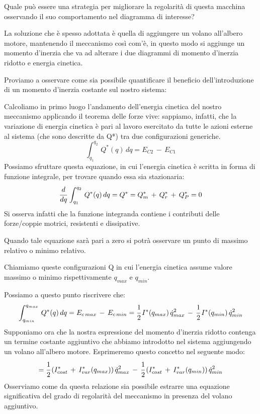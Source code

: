 Quale può essere una strategia per migliorare la regolarità di questa macchina osservando il suo comportamento nel diagramma di interesse?

La soluzione che è spesso adottata è quella di aggiungere un volano all'albero motore, mantenendo il meccanismo così com'è, in questo modo si aggiunge un momento d'inerzia che va ad alterare i due diagrammi di momento d'inerzia ridotto e energia cinetica.

Proviamo a osservare come sia possibile quantificare il beneficio dell'introduzione di un momento d'inerzia costante sul nostro sistema:

Calcoliamo in primo luogo l'andamento dell'energia cinetica del nostro meccanismo applicando il teorema delle forze vive: sappiamo, infatti, che la variazione di energia cinetica è pari al lavoro esercitato da tutte le azioni esterne al sistema (che sono descritte da Q*) tra due configurazioni generiche.
\[\int_{q_1}^{q_2}\,Q^*(q)\,dq = E_{C2}\,-\,E_{C1}\]
Possiamo sfruttare questa equazione, in cui l'energia cinetica è scritta in forma di funzione integrale, per trovare quando essa sia stazionaria:
\[\cfrac{d}{dq}\,\int_{q_1}^{q_2}\,Q^*(q)\,dq = Q^* = Q^*_m\,+\,Q^*_r\,+\,Q^*_P = 0\]
Si osserva infatti che la funzione integranda contiene i contributi delle forze/coppie motrici, resistenti e dissipative.

Quando tale equazione sarà  pari a zero si potrà osservare un punto di massimo relativo o minimo relativo.

Chiamiamo queste configurazioni Q in cui l'energia cinetica assume valore massimo o minimo rispettivamente $q_{max}$ e $q_{min}$.

Possiamo a questo punto riscrivere che:
\[\int_{q_{min}}^{q_{max}}\,Q^*(q)\,dq = E_{c\,max}\,-\,E_{c\,min} = \cfrac{1}{2}\,I^*(q_{max})\,\dot{q}_{max}^2\,-\,\cfrac{1}{2}\,I^*(q_{min})\,\dot{q}_{min}^2\]
Supponiamo ora che la nostra espressione del momento d'inerzia ridotto contenga un termine costante aggiuntivo che abbiamo introdotto nel sistema aggiungendo un volano all'albero motore. Esprimeremo questo concetto nel seguente modo:
\[=\cfrac{1}{2}\,(I^*_{cost}\,+\,I^*_{var}(q_{max}))\,\dot{q}_{max}^2\,-\,\cfrac{1}{2}\,(I^*_{cost}\,+\,I^*_{var}(q_{min}))\,\dot{q}_{min}^2\]
Osserviamo come da questa relazione sia possibile estrarre una equazione significativa del grado di regolarità del meccanismo in presenza del volano aggiuntivo.

